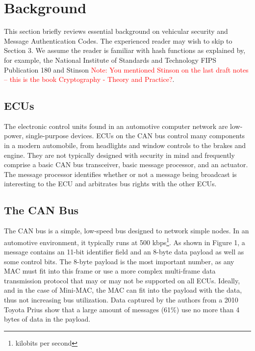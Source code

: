 \section{Background}

This section briefly reviews essential background on vehicular security and Message Authentication Codes. The experienced reader may wish to skip to Section 3. We assume the reader is familiar with hash functions as explained by, for example, the National Institute of Standards and Technology FIPS Publication 180\cite{FIPS-180-4} and Stinson \textcolor{red}{Note: You mentioned Stinson on the last draft notes -- this is the book Cryptography - Theory and Practice?}.

\subsection{ECUs}
The electronic control units found in an automotive computer network are low-power, single-purpose devices. ECUs on the CAN bus control many components in a modern automobile, from headlights and window controls to the brakes and engine. They are not typically designed with security in mind and frequently comprise a basic CAN bus transceiver, basic message processor, and an actuator. The message processor identifies whether or not a message being broadcast is interesting to the ECU and arbitrates bus rights with the other ECUs. %


\subsection{The CAN Bus}
The CAN bus is a simple, low-speed bus designed to network simple nodes. In an automotive environment, it typically runs at 500 kbps\footnote{kilobits per second}. As shown in Figure 1, a message contains an 11-bit identifier field and an 8-byte data payload as well as some control bits. The 8-byte payload is the most important number, as any MAC must fit into this frame or use a more complex multi-frame data transmission protocol that may or may not be supported on all ECUs. Ideally, and in the case of Mini-MAC, the MAC can fit into the payload with the data, thus not increasing bus utilization. Data captured by the authors from a 2010 Toyota Prius show that a large amount of messages (61\%) use no more than 4 bytes of data in the payload.

